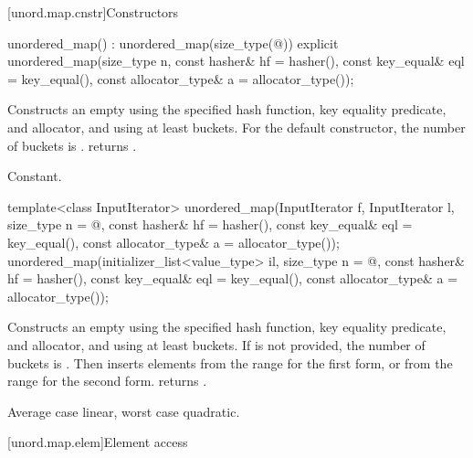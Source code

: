 [unord.map.cnstr]{Constructors}

%
\begin{itemdecl}
unordered_map() : unordered_map(size_type(@\seebelow@)) { }
explicit unordered_map(size_type n,
                       const hasher& hf = hasher(),
                       const key_equal& eql = key_equal(),
                       const allocator_type& a = allocator_type());
\end{itemdecl}

\begin{itemdescr}
\pnum
\effects Constructs an empty  using the
specified hash function, key equality predicate, and allocator, and
using at least  buckets.  For the default constructor,
the number of buckets is .
 returns .

\pnum
\complexity Constant.
\end{itemdescr}

%
\begin{itemdecl}
template<class InputIterator>
  unordered_map(InputIterator f, InputIterator l,
                size_type n = @\seebelow@,
                const hasher& hf = hasher(),
                const key_equal& eql = key_equal(),
                const allocator_type& a = allocator_type());
unordered_map(initializer_list<value_type> il,
              size_type n = @\seebelow@,
              const hasher& hf = hasher(),
              const key_equal& eql = key_equal(),
              const allocator_type& a = allocator_type());
\end{itemdecl}

\begin{itemdescr}
\pnum
\effects Constructs an empty  using the
specified hash function, key equality predicate, and allocator, and
using at least  buckets. If  is not
provided, the number of buckets is . Then
inserts elements from the range 
for the first form, or from the range
 for the second form.
 returns .

\pnum
\complexity Average case linear, worst case quadratic.
\end{itemdescr}

[unord.map.elem]{Element access}

